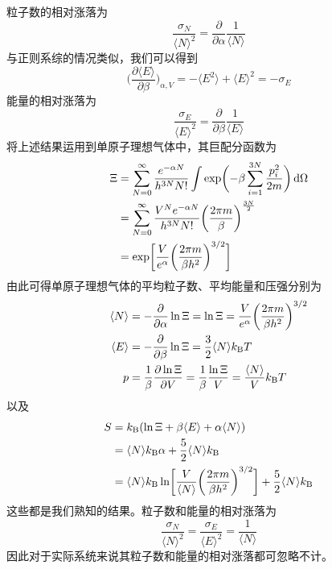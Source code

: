 \documentclass[UTF8,oneside,openany]{ctexbook}
\DeclareMathOperator\dif{d\!}
\newcommand\aver[1]{\langle#1\rangle}
\newcommand\kb{k_{\text{B}}}
\begin{document}
粒子数的相对涨落为
\begin{equation}
\frac{\sigma_N}{\aver{N}^2}=\frac{\partial}{\partial\alpha}\frac{1}{\aver{N}}
\end{equation}
与正则系综的情况类似，我们可以得到
\begin{equation}
\biggl(\frac{\partial\aver{E}}{\partial\beta}\biggr)_{\alpha,V}=-\aver{E^2}+\aver{E}^2=-\sigma_E
\end{equation}
能量的相对涨落为
\begin{equation}
\frac{\sigma_E}{\aver{E}^2}=\frac{\partial}{\partial\beta}\frac{1}{\aver{E}}
\end{equation}
将上述结果运用到单原子理想气体中，其巨配分函数为
\begin{align}\label{Xi}
\Xi&=\sum_{N=0}^{\infty}\frac{e^{-\alpha N}}{h^{3N}N!}\int\exp\biggl(-\beta \sum_{i=1}^{3N}\frac{p_i^2}{2m}\biggr)\dif\Omega\notag\\
&=\sum_{N=0}^{\infty}\frac{V^Ne^{-\alpha N}}{h^{3N}N!}\bigg(\frac{2\pi m}{\beta}\bigg)^{\frac{3N}{2}}\notag\\
&=\exp\biggl[\frac{V}{e^{\alpha}}\biggl(\frac{2\pi m}{\beta h^2}\biggr)^{3/2}\biggr]
\end{align}
由此可得单原子理想气体的平均粒子数、平均能量和压强分别为
\begin{align}\label{hehe}
\aver{N}&=-\frac{\partial}{\partial\alpha}\ln\Xi=\ln\Xi=\frac{V}{e^{\alpha}}\biggl(\frac{2\pi m}{\beta h^2}\biggr)^{3/2}\notag\\
\aver{E}&=-\frac{\partial}{\partial\beta}\ln\Xi=\frac32\aver{N}\kb T\notag\\
p&=\frac{1}{\beta}\frac{\partial\ln\Xi}{\partial V}=\frac{1}{\beta}\frac{\ln\Xi}{V}=\frac{\aver{N}}{V}\kb T
\end{align}
以及
\begin{align}
S&=\kb(\ln\Xi+\beta\aver{E}+\alpha\aver{N})\notag\\
&=\aver{N}\kb\alpha+\frac52\aver{N}\kb\notag\\
&=\aver{N}\kb\ln\biggl[\frac{V}{\aver{N}}\biggl(\frac{2\pi m}{\beta h^2}\biggr)^{3/2}\biggr]+\frac52\aver{N}\kb
\end{align}
这些都是我们熟知的结果。粒子数和能量的相对涨落为
\begin{equation}
\frac{\sigma_N}{\aver{N}^2}=\frac{\sigma_E}{\aver{E}^2}=\frac{1}{\aver{N}}
\end{equation}
因此对于实际系统来说其粒子数和能量的相对涨落都可忽略不计。
\end{document}
